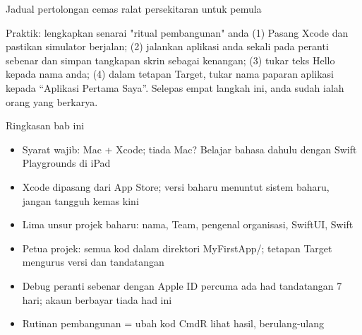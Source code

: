\begin{center}\small\color{gray}Jadual pertolongan cemas ralat persekitaran untuk pemula\end{center}

\begin{tcbpractice}{Praktik: lengkapkan senarai "ritual pembangunan" anda}
(1) Pasang Xcode dan pastikan simulator berjalan; (2) jalankan aplikasi anda sekali pada peranti sebenar dan simpan tangkapan skrin sebagai kenangan; (3) tukar teks Hello kepada nama anda; (4) dalam tetapan Target, tukar nama paparan aplikasi kepada “Aplikasi Pertama Saya”. Selepas empat langkah ini, anda sudah ialah orang yang berkarya.

\end{tcbpractice}

\begin{tcbsummary}{Ringkasan bab ini}
\begin{itemize}
  \item Syarat wajib: Mac + Xcode; tiada Mac? Belajar bahasa dahulu dengan Swift Playgrounds di iPad
  \item Xcode dipasang dari App Store; versi baharu menuntut sistem baharu, jangan tangguh kemas kini
  \item Lima unsur projek baharu: nama, Team, pengenal organisasi, SwiftUI, Swift
  \item Petua projek: semua kod dalam direktori MyFirstApp/; tetapan Target mengurus versi dan tandatangan
  \item Debug peranti sebenar dengan Apple ID percuma ada had tandatangan 7 hari; akaun berbayar tiada had ini
  \item Rutinan pembangunan = ubah kod CmdR lihat hasil, berulang-ulang
\end{itemize}

\end{tcbsummary}
